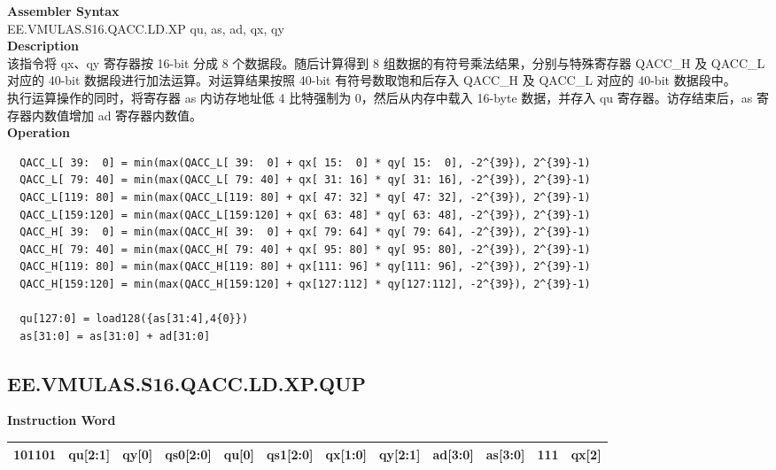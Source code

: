 \textbf{Assembler Syntax} \\
EE.VMULAS.S16.QACC.LD.XP qu, as, ad, qx, qy \\
\textbf{Description} \\
该指令将 qx、qy 寄存器按 16-bit 分成 8 个数据段。随后计算得到 8 组数据的有符号乘法结果，分别与特殊寄存器 QACC\_H 及 QACC\_L 对应的 40-bit 数据段进行加法运算。对运算结果按照 40-bit 有符号数取饱和后存入 QACC\_H 及 QACC\_L 对应的 40-bit 数据段中。\\
执行运算操作的同时，将寄存器 as 内访存地址低 4 比特强制为 0，然后从内存中载入 16-byte 数据，并存入 qu 寄存器。访存结束后，as 寄存器内数值增加 ad 寄存器内数值。\\
\textbf{Operation}
\begin{lstlisting}
  QACC_L[ 39:  0] = min(max(QACC_L[ 39:  0] + qx[ 15:  0] * qy[ 15:  0], -2^{39}), 2^{39}-1)
  QACC_L[ 79: 40] = min(max(QACC_L[ 79: 40] + qx[ 31: 16] * qy[ 31: 16], -2^{39}), 2^{39}-1)
  QACC_L[119: 80] = min(max(QACC_L[119: 80] + qx[ 47: 32] * qy[ 47: 32], -2^{39}), 2^{39}-1)
  QACC_L[159:120] = min(max(QACC_L[159:120] + qx[ 63: 48] * qy[ 63: 48], -2^{39}), 2^{39}-1)
  QACC_H[ 39:  0] = min(max(QACC_H[ 39:  0] + qx[ 79: 64] * qy[ 79: 64], -2^{39}), 2^{39}-1)
  QACC_H[ 79: 40] = min(max(QACC_H[ 79: 40] + qx[ 95: 80] * qy[ 95: 80], -2^{39}), 2^{39}-1)
  QACC_H[119: 80] = min(max(QACC_H[119: 80] + qx[111: 96] * qy[111: 96], -2^{39}), 2^{39}-1)
  QACC_H[159:120] = min(max(QACC_H[159:120] + qx[127:112] * qy[127:112], -2^{39}), 2^{39}-1)

  qu[127:0] = load128({as[31:4],4{0}})
  as[31:0] = as[31:0] + ad[31:0]
\end{lstlisting}

\clearpage
\subsection{EE.VMULAS.S16.QACC.LD.XP.QUP}\label{instruction:EEVMULASS16QACCLDXPQUP}
\setlength\tabcolsep{6pt}
\textbf{Instruction Word} \\
\begin{tabular}{|c|c|c|c|c|c|c|c|c|c|c|c|}
	\hline
	101101 & qu[2:1] & qy[0] & qs0[2:0] & qu[0] & qs1[2:0] & qx[1:0] & qy[2:1] & ad[3:0] & as[3:0] & 111 & qx[2] \\
	\hline
\end{tabular}

